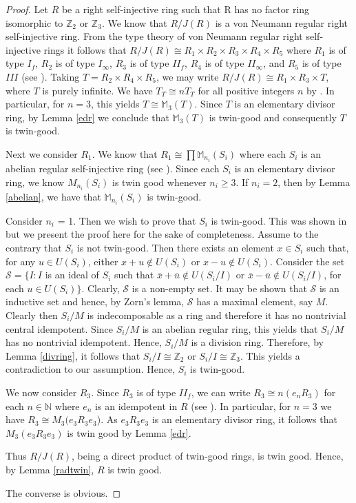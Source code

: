 \documentclass{amsart}
\begin{document}
\begin{proof}
Let $R$ be a right self-injective ring such that R has no factor ring isomorphic to $\mathbb Z_2$ or $\mathbb Z_3$. We know that $R/J(R)$ is a von Neumann regular right self-injective ring. From the type theory of von Neumann regular right self-injective rings it follows that $R/J(R) \cong R_1 \times R_2 \times R_3 \times R_4 \times R_5$ where $R_1$ is of type $I_f$, $R_2$ is of type $I_\infty$, $R_3$ is of type $II_f$, $R_4$ is of type $II_\infty$, and $R_5$ is of type $III$ (see \cite[Theorem 10.22]{Goodearl}).  Taking $T=R_2 \times R_4 \times R_5$, we may write $R/J(R) \cong R_1 \times R_3 \times T$, where $T$ is purely infinite. We have $T_T\cong nT_T$ for all positive integers $n$ by \cite[Theorem 10.16]{Goodearl}. In particular, for $n=3$, this yields $T \cong \mathbb M_{3}(T)$. Since $T$ is an elementary divisor ring, by Lemma \ref{edr} we conclude that $\mathbb M_{3}(T)$ is twin-good and consequently $T$ is twin-good.

Next we consider $R_1$. We know that $R_1 \cong \prod\mathbb{M}_{n_i}(S_i)$ where each $S_i$ is an abelian regular self-injective ring (see \cite[Theorem 10.24]{Goodearl}).  Since each $S_i$ is an elementary divisor ring, we know $M_{n_i}(S_i)$ is twin good whenever $n_i \ge 3$. If $n_i=2$, then by Lemma \ref{abelian}, we have that $\mathbb M_{n_i}(S_i)$ is twin-good.

Consider $n_{i}$ = 1. Then we wish to prove that $S_i$ is twin-good. This was shown in \cite{Perkins} but we present the proof here for the sake of completeness. Assume to the contrary that $S_i$ is not twin-good. Then there exists an element $x\in S_i$ such that, for any $u\in U(S_i)$, either $x+u\not\in U(S_i)$ or $x-u\not\in U(S_i)$. Consider the set $\mathcal S=\{I: I$ is an ideal of $S_i$ such that $\bar{x}+\bar{u}\not\in U(S_i/I)$ or $\bar{x}-\bar{u}\not\in U(S_i/I)$, for each $u\in U(S_i)\}$. Clearly, $\mathcal S$ is a non-empty set. It may be shown that $\mathcal S$ is an inductive set and hence, by Zorn's lemma, $\mathcal S$ has a maximal element, say $M$. Clearly then $S_i/M$ is indecomposable as a ring and therefore it has no nontrivial central idempotent. Since $S_i/M$ is an abelian regular ring, this yields that $S_i/M$ has no nontrivial idempotent. Hence, $S_i/M$ is a division ring. Therefore, by Lemma \ref{divring}, it follows that $S_i/I\cong \mathbb Z_2$ or $S_i/I \cong \mathbb Z_3$. This yields a contradiction to our assumption. Hence, $S_i$ is twin-good. 

We now consider $R_3$. Since $R_3$ is of type $II_f$, we can write $R_3 \cong n(e_{n}R_3)$ for each $n \in \mathbb N$ where $e_n$ is an idempotent in $R$ (see \cite[Proposition 10.28]{Goodearl}). In particular, for $n = 3$ we have $R_3 \cong M_{3}(e_{3}R_{3}e_{3}$). As $e_{3}R_{3}e_{3}$ is an elementary divisor ring, it follows that $M_{3}(e_{3}R_{3}e_{3})$ is twin good by Lemma \ref{edr}.

Thus $R/J(R)$, being a direct product of twin-good rings, is twin good. Hence, by Lemma \ref{radtwin}, $R$ is twin good.

The converse is obvious.
\end{proof}
\end{document}

